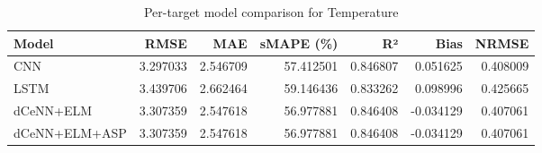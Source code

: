 \begin{table}
\caption{Per-target model comparison for Temperature}
\begin{tabular}{lrrrrrr}
\toprule
Model & RMSE & MAE & sMAPE (\%) & R² & Bias & NRMSE \\
\midrule
CNN & 3.297033 & 2.546709 & 57.412501 & 0.846807 & 0.051625 & 0.408009 \\
LSTM & 3.439706 & 2.662464 & 59.146436 & 0.833262 & 0.098996 & 0.425665 \\
dCeNN+ELM & 3.307359 & 2.547618 & 56.977881 & 0.846408 & -0.034129 & 0.407061 \\
dCeNN+ELM+ASP & 3.307359 & 2.547618 & 56.977881 & 0.846408 & -0.034129 & 0.407061 \\
\bottomrule
\end{tabular}
\end{table}
